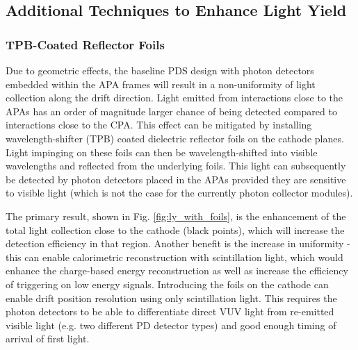 



\subsection{Additional Techniques to Enhance Light Yield}
\label{sec:fdsp-pd-enh}



\subsubsection{TPB-Coated Reflector Foils}

Due to geometric effects, the baseline PDS design with photon detectors embedded within the APA frames will result in a non-uniformity of light collection along the drift direction. Light emitted from interactions close to the APAs has an order of magnitude larger chance of being detected compared to interactions close to the CPA. This effect can be mitigated by installing wavelength-shifter (TPB) coated dielectric reflector foils on the cathode planes. Light impinging on these foils
can then be wavelength-shifted into visible wavelengths and reflected from the underlying foils. This light can subsequently be detected by photon detectors placed in the APAs provided they are sensitive to visible light (which is not the case for the currently photon collector modules). 

The primary result, shown in Fig. \ref{fig:ly_with_foils}, is the enhancement of the total light collection close to the cathode (black points), which will increase the detection efficiency in that region. 
Another benefit is the increase in uniformity - this can enable calorimetric reconstruction with scintillation light, which would enhance the charge-based energy reconstruction as well as increase the efficiency of triggering on low energy signals. Introducing the foils on the cathode can enable drift position resolution  using only scintillation light. This requires the photon detectors to be able to differentiate direct VUV light from re-emitted visible light (e.g. two different PD detector types) and good enough timing of arrival of first light.

